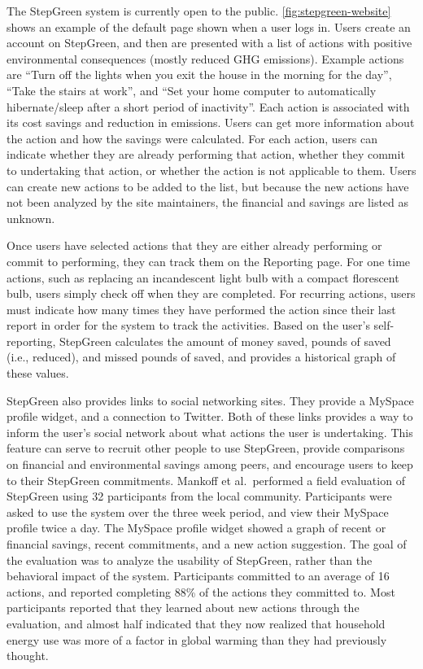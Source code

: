 The StepGreen system is currently open to the public. \autoref{fig:stepgreen-website} shows an example of the default page shown when a user logs in. Users create an account on StepGreen, and then are presented with a list of actions with positive environmental consequences (mostly reduced GHG emissions). Example actions are ``Turn off the lights when you exit the house in the morning for the day'', ``Take the stairs at work'', and ``Set your home computer to automatically hibernate/sleep after a short period of inactivity''. Each action is associated with its cost savings and reduction in \COtwo emissions. Users can get more information about the action and how the savings were calculated. For each action, users can indicate whether they are already performing that action, whether they commit to undertaking that action, or whether the action is not applicable to them. Users can create new actions to be added to the list, but because the new actions have not been analyzed by the site maintainers, the financial and \COtwo savings are listed as unknown.

Once users have selected actions that they are either already performing or commit to performing, they can track them on the Reporting page. For one time actions, such as replacing an incandescent light bulb with a compact florescent bulb, users simply check off when they are completed. For recurring actions, users must indicate how many times they have performed the action since their last report in order for the system to track the activities. Based on the user's self-reporting, StepGreen calculates the amount of money saved, pounds of \COtwo saved (i.e., reduced), and missed pounds of \COtwo saved, and provides a historical graph of these values.

StepGreen also provides links to social networking sites. They provide a MySpace profile widget, and a connection to Twitter. Both of these links provides a way to inform the user's social network about what actions the user is undertaking. This feature can serve to recruit other people to use StepGreen, provide comparisons on financial and environmental savings among peers, and encourage users to keep to their StepGreen commitments. Mankoff et al.\ performed a field evaluation of StepGreen using 32 participants from the local community. Participants were asked to use the system over the three week period, and view their MySpace profile twice a day. The MySpace profile widget showed a graph of recent \COtwo or financial savings, recent commitments, and a new action suggestion. The goal of the evaluation was to analyze the usability of StepGreen, rather than the behavioral impact of the system. Participants committed to an average of 16 actions, and reported completing 88\% of the actions they committed to. Most participants reported that they learned about new actions through the evaluation, and almost half indicated that they now realized that household energy use was more of a factor in global warming than they had previously thought.

